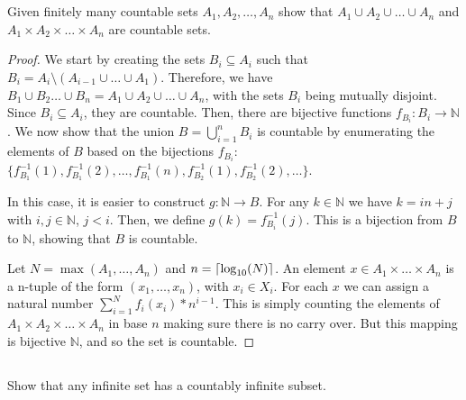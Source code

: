 \section{}


\subsection{} Given finitely many countable sets $A_1, A_2, \dots, A_n$ show that $A_1 \cup A_2 \cup \dots \cup A_n$ and $A_1 \times A_2 \times \dots \times A_n$ are countable sets.

\begin{proof}

We start by creating the sets $B_i \subseteq A_i$ such that $B_i = A_i \setminus (A_{i-1} \cup \dots \cup A_1)$. Therefore, we have $B_1 \cup B_2 \dots \cup B_n = A_1 \cup A_2 \cup \dots \cup A_n$, with the sets $B_i$ being mutually disjoint. Since $B_i \subseteq A_i$, they are countable. Then, there are bijective functions $f_{B_i}: B_i \rightarrow \mathbb{N}$. We now show that the union $B = \bigcup_{i=1}^n B_i$ is countable by enumerating the elements of $B$ based on the bijections $f_{B_i}$: $\{f_{B_1}^{-1}(1), f_{B_1}^{-1}(2), \dots, f_{B_1}^{-1}(n), f_{B_2}^{-1}(1), f_{B_2}^{-1}(2), \dots \}$.

In this case, it is easier to construct $g: \mathbb{N} \rightarrow B$. For any $k\in\mathbb{N}$ we have $k = in+j$ with $i ,j\in\mathbb{N}$, $j<i$. Then, we define $g(k) = f_{B_{i}}^{-1}(j)$. This is a bijection from $B$ to $\mathbb{N}$, showing that $B$ is countable.


Let $N = \max(A_1, \dots, A_n)$ and $n = \left\lceil \log_{10}(N) \right\rceil$. An element $x \in A_1 \times \dots \times A_n$ is a n-tuple of the form $(x_1, \dots, x_n)$, with $x_i \in X_i$. For each $x$ we can assign a natural number $\sum_{i=1}^N f_i(x_i) * n ^ {i-1}$. This is simply counting the elements of $A_1 \times A_2 \times \dots \times A_n$ in base $n$ making sure there is no carry over. But this mapping is bijective $\mathbb{N}$, and so the set is countable.

\end{proof}

\subsection{} Show that any infinite set has a countably infinite subset.

